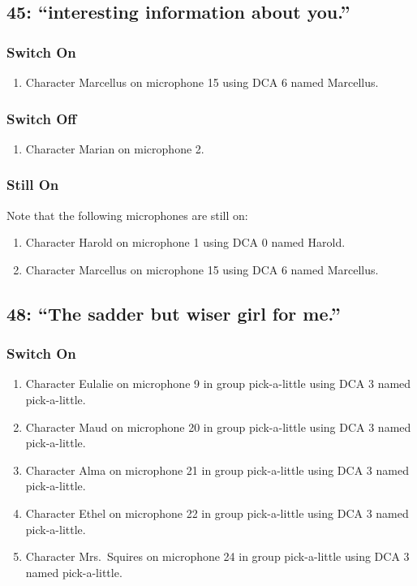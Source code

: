 \subsection* {45: ``interesting information about you.''}
\subsubsection* {Switch On}
\begin{enumerate}
\item Character Marcellus on microphone 15 using DCA 6 named Marcellus.
\end{enumerate}
\subsubsection* {Switch Off}
\begin{enumerate}
\item Character Marian on microphone 2.
\end{enumerate}
\subsubsection* {Still On}
Note that the following microphones are still on:
\begin{enumerate}
\item Character Harold on microphone 1 using DCA 0 named Harold.
\item Character Marcellus on microphone 15 using DCA 6 named Marcellus.
\end{enumerate}
\subsection* {48: ``The sadder but wiser girl for me.''}
\subsubsection* {Switch On}
\begin{enumerate}
\item Character Eulalie on microphone 9 in group pick-a-little using DCA 3 named pick-a-little.
\item Character Maud on microphone 20 in group pick-a-little using DCA 3 named pick-a-little.
\item Character Alma on microphone 21 in group pick-a-little using DCA 3 named pick-a-little.
\item Character Ethel on microphone 22 in group pick-a-little using DCA 3 named pick-a-little.
\item Character Mrs.~Squires on microphone 24 in group pick-a-little using DCA 3 named pick-a-little.
\end{enumerate}

